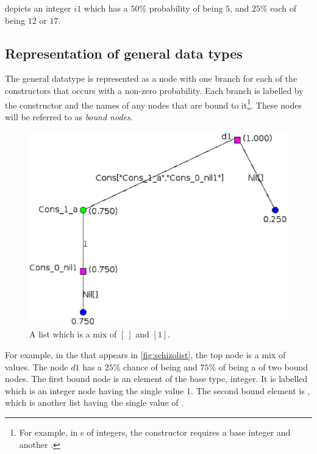  depicts an
integer $i1$ which has 
a $50\%$ probability of being $5$, and $25\%$ each of being $12$ or $17$.

\subsection{Representation of general data types}\label{subsec:representgeneraldatatyps}
The general datatype is represented 
as a node with one branch for each of the constructors that occurs
with a non-zero probability. Each branch is labelled by the 
constructor and the names of any nodes that are 
bound to it\footnote{For example, in s of 
integers, the
 constructor requires a base integer and another .}.
These
nodes will be referred to as  \emph{bound nodes}.


\begin{figure}[htbp]
\centerline{
\includegraphics[scale=.75]{images/listExample.eps}
}
\caption{A list which is a mix of $[\ ]$ and $[1]$.}\label{fig:schizolist}
\end{figure}



For example, in the  that appears in \vref{fig:schizolist}, 
the top node  is a mix of values. The node $d1$ has a $25\%$ chance of 
being  and $75\%$ of being a  of two bound nodes.
The first bound node is an element of the base type, integer. 
It is labelled  which
is an integer node having the single value 1. The second bound element is 
,  which is another list having the
 single value of . 




